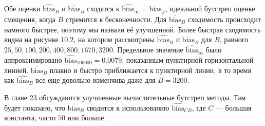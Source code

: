 Обе оценки $\widehat{\text{bias}}_{B}$ и $\overline{\text{bias}}_{B}$ сходятся к $\widehat{\text{bias}}_{\infty} = \text{bias}_{\hat{F}}$, идеальной бутстреп оценке смещения, когда $B$ стремится к бесконечности. Для $\overline{\text{bias}}_{B}$ сходимость происходит намного быстрее, поэтому мы назвали её улучшенной. Более быстрая сходимость видна на рисунке 10.2, на котором рассмотрены $\widehat{\text{bias}}_{B}$ и $\overline{\text{bias}}_{B}$ для $B$, равного $25, 50, 100, 200, 400, 800, 1670, 3200$. Предельное значение $\widehat{\text{bias}}_{\infty}$ было аппроксимировано $\widehat{\text{bias}}_{100000}= 0.0079$, показанным пунктирной горизонтальной линией. $\overline{\text{bias}}_{B}$ плавно и быстро приближается к пунктирной линии, в то время как $\widehat{\text{bias}}_{B}$ все еще довольно изменчива даже для $B = 3200$.

В главе 23 обсуждаются улучшенные вычислительные бутстреп методы. Там будет показано, что $\overline{\text{bias}}_{B}$ сводится к использованию $\widehat{\text{bias}}_{CB}$, где $C$ --- большая константа, часто $50$ или больше. %